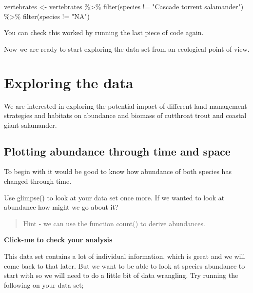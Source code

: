 \documentclass[
]{book}
\newenvironment{Shaded}{\begin{snugshade}}{\end{snugshade}}
\newcommand{\FunctionTok}[1]{\textcolor[rgb]{0.00,0.00,0.00}{#1}}
\newcommand{\NormalTok}[1]{#1}
\newcommand{\OtherTok}[1]{\textcolor[rgb]{0.56,0.35,0.01}{#1}}
\newcommand{\SpecialCharTok}[1]{\textcolor[rgb]{0.00,0.00,0.00}{#1}}
\newcommand{\StringTok}[1]{\textcolor[rgb]{0.31,0.60,0.02}{#1}}
\begin{document}
\begin{Shaded}
\begin{Highlighting}[]
\NormalTok{vertebrates }\OtherTok{\textless{}{-}}\NormalTok{ vertebrates }\SpecialCharTok{\%\textgreater{}\%} 
  \FunctionTok{filter}\NormalTok{(species }\SpecialCharTok{!=} \StringTok{"Cascade torrent salamander"}\NormalTok{) }\SpecialCharTok{\%\textgreater{}\%} 
  \FunctionTok{filter}\NormalTok{(species }\SpecialCharTok{!=} \StringTok{"NA"}\NormalTok{)}
\end{Highlighting}
\end{Shaded}

You can check this worked by running the last piece of code again.

Now we are ready to start exploring the data set from an ecological point of view.

\hypertarget{exploring-the-data}{%
\chapter{Exploring the data}\label{exploring-the-data}}

We are interested in exploring the potential impact of different land management strategies and habitats on abundance and biomass of cutthroat trout and coastal giant salamander.

\hypertarget{plotting-abundance-through-time-and-space}{%
\section{Plotting abundance through time and space}\label{plotting-abundance-through-time-and-space}}

To begin with it would be good to know how abundance of both species has changed through time.

Use glimpse() to look at your data set once more. If we wanted to look at abundance how might we go about it?

\begin{quote}
Hint - we can use the function count() to derive abundances.
\end{quote}

\textbf{Click-me to check your analysis}

This data set contains a lot of individual information, which is great and we will come back to that later. But we want to be able to look at species abundance to start with so we will need to do a little bit of data wrangling. Try running the following on your data set;
\end{document}
